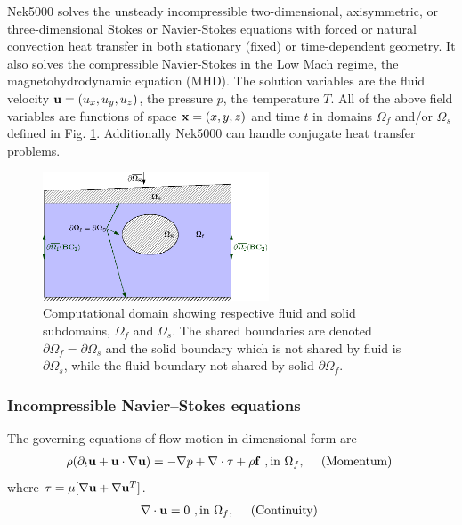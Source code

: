 Nek5000 solves the unsteady incompressible two-dimensional,
axisymmetric, or three-dimensional Stokes or Navier-Stokes
equations with forced or natural convection heat transfer in
both stationary (fixed) or time-dependent geometry. It also solves the compressible Navier-Stokes in the Low Mach regime, the magnetohydrodynamic equation (MHD).
The solution variables are the fluid velocity
${\bf u}=(u_{x},u_{y},u_{z})$, the pressure $p$,
the temperature $T$. 
All of the above field variables
are functions of space ${\bf x}=(x,y,z)$ and time $t$
in domains $\Omega_f$ and/or $\Omega_s$ defined in Fig. \ref{fig:domains}.
Additionally Nek5000 can handle conjugate heat transfer problems.

\begin{figure}
\centering
\includegraphics[width=0.6\textwidth]{Figs/walls}
\caption{Computational domain showing respective fluid
and solid subdomains, $\Omega_f$ and $\Omega_s$. The shared boundaries are denoted $\partial\Omega_f=\partial\Omega_s$ and the solid boundary which is not shared by fluid is $\overline{\partial\Omega_s}$, while the fluid boundary not shared by solid $\overline{\partial\Omega_f}$.}
\label{fig:domains}
\end{figure}

\subsubsection*{Incompressible Navier--Stokes equations}
%
The governing equations of flow motion in dimensional form are
\begin{eqnarray}\label{eq:ns_momentum}
\rho(\partial_{t} {\bf u} +{\bf u} \cdot \nabla {\bf u}) = - \nabla p + \nabla \cdot \tau + \rho {\bf f} \,\, , \text{in } \Omega_f , \quad \text{  (Momentum)  } 
\end{eqnarray}
where $ \tau=\mu[\nabla \mathbf{u}+\nabla \mathbf{u}^{T}]$.
\begin{eqnarray}\label{eq:ns_cont}
 \nabla \cdot {\bf u} =0 \,\, , \text{in } \Omega_f, \quad \text{  (Continuity)  }   
\end{eqnarray}

